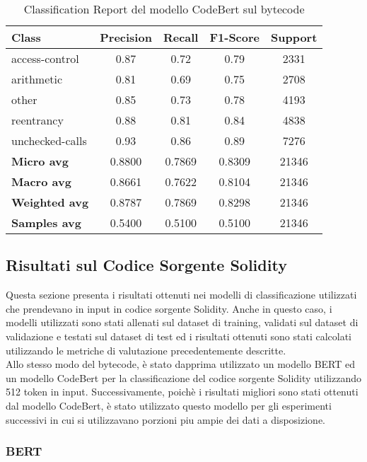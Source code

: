 \documentclass[../../Thesis.tex]{subfiles}
\begin{document}
\begin{table}[H]
\centering
\small
\begin{tabular}{lcccc}
\hline
\textbf{Class} & \textbf{Precision} & \textbf{Recall} & \textbf{F1-Score} & \textbf{Support} \\
\hline
access-control & 0.87 & 0.72 & 0.79 & 2331 \\
arithmetic & 0.81 & 0.69 & 0.75 & 2708 \\
other & 0.85 & 0.73 & 0.78 & 4193 \\
reentrancy & 0.88 & 0.81 & 0.84 & 4838 \\
unchecked-calls & 0.93 & 0.86 & 0.89 & 7276 \\
\hline
\textbf{Micro avg} & 0.8800 & 0.7869 & 0.8309 & 21346 \\
\textbf{Macro avg} & 0.8661 & 0.7622 & 0.8104 & 21346 \\
\textbf{Weighted avg} & 0.8787 & 0.7869 & 0.8298 & 21346 \\
\textbf{Samples avg} & 0.5400 & 0.5100 & 0.5100 & 21346 \\
\hline
\end{tabular}
\caption{Classification Report del modello CodeBert sul bytecode}
\end{table}

\subsection{Risultati sul Codice Sorgente Solidity}
Questa sezione presenta i risultati ottenuti nei modelli di classificazione utilizzati che prendevano in input in codice sorgente Solidity. Anche in questo caso, i  modelli utilizzati sono stati allenati sul dataset di training, validati sul dataset di validazione e testati sul dataset di test ed i risultati ottenuti sono stati calcolati utilizzando le metriche di valutazione precedentemente descritte.\\
Allo stesso modo del bytecode, è stato dapprima utilizzato un modello BERT ed un modello CodeBert per la classificazione del codice sorgente Solidity utilizzando 512 token in input. Successivamente, poichè i risultati migliori sono stati ottenuti dal modello CodeBert,  è stato utilizzato questo modello per gli esperimenti successivi in cui si utilizzavano porzioni piu ampie dei dati a disposizione.\\
\subsubsection{BERT}
\end{document}

